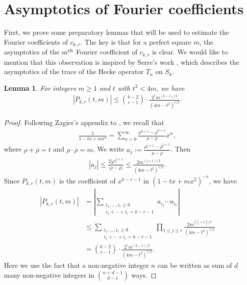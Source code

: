 \documentclass[11pt,letterpaper,reqno]{amsart}
\numberwithin{figure}{section}
\numberwithin{table}{section}
\theoremstyle{definition}
\theoremstyle{plain}
\newtheorem{lemma}[theorem]{Lemma}
\theoremstyle{definition}
\theoremstyle{definition}
\theoremstyle{remark}
\numberwithin{equation}{section}
\theoremstyle{remark}
\begin{document}
\section{Asymptotics of Fourier coefficients  }\label{sect:Prelim}
First, we prove some preparatory lemmas that will be used to estimate the Fourier coefficients of $c_{k,r}$. The key is that for a perfect square $m$, the asymptotics of the $m^{{\rm th}}$ Fourier coefficient of $c_{k,r}$ is clear. We would like to mention that this observation is inspired by Serre's work \cite[Proposition 3]{SerretraceofHecke}, which describes the asymptotics of the trace of the Hecke operator $T_n$ on $S_k$. 
\begin{lemma}\label{lem:boundP_k,r}
    For integers $m\geq1$ and $t$ with $t^2<4m$, we have
    \begin{align}
        |P_{k,r}(t,m)|\leq\binom{k-2}{r-1}\cdot\frac{2^rm^{(k-1)/2}}{(4m-t^2)^{r/2}}.
    \end{align}
\end{lemma}
\begin{proof}
   Following Zagier's appendix to \cite{LangbookandZagierappendix}, we recall that
   \begin{align}
       \frac{1}{1-tx+mx^2}=\sum_{n=0}^{\infty}\frac{\rho^{n+1}-\overline{\rho}^{n+1}}{\rho-\overline{\rho}}x^n,
   \end{align}
   where $\rho+\overline{\rho}=t$ and $\rho\cdot\overline{\rho}=m$. We write $a_j:=\frac{\rho^{j+1}-\overline{\rho}^{j+1}}{\rho-\overline{\rho}}$. Then
   \begin{align}
       |a_j|\leq\frac{2|\rho|^{j+1}}{|\rho-\overline{\rho}|}\leq\frac{2m^{(j+1)/2}}{(4m-t^2)^{1/2}}.
   \end{align}
   Since $P_{k,r}(t,m)$ is the coefficient of $x^{k-r-1}$ in $(1-tx+mx^2)^{-r}$, we have
   \begin{align}
       |P_{k,r}(t,m)|&=\left|\sum_{\substack{i_1,...,i_r\geq0\\i_1+\cdots+i_r=k-r-1}}a_{i_1}\cdots a_{i_r}\right|\\&\leq \sum_{\substack{i_1,...,i_r\geq0\\i_1+\cdots+i_r=k-r-1}}\prod_{1\leq j\leq r}\frac{2m^{(i_j+1)/2}}{(4m-t^2)^{1/2}}\\&=\binom{k-2}{r-1}\cdot\frac{2^rm^{(k-1)/2}}{(4m-t^2)^{r/2}}.
   \end{align}
   Here we use the fact that a non-negative integer $n$ can be written as sum of $d$ many non-negative integers in $\binom{n+d-1}{d-1}$ ways.
\end{proof}
\end{document}
